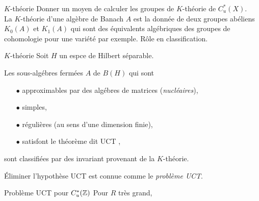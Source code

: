 \begin{frame}{$K$-th\'eorie}
Donner un moyen de calculer les groupes de $K$-th\'eorie de $C^*_u(X)$.\\
\vfill
La $K$-th\'eorie d'une alg\`ebre de Banach $A$ est la donn\'ee de deux groupes ab\'eliens $K_0(A)$ et $K_1(A)$ qui sont des \'equivalents alg\'ebriques des groupes de cohomologie pour une vari\'et\'e par exemple.  
\vfill
R\^{o}le en classification.\\
\vfill

\end{frame}

\begin{frame}{$K$-th\'eorie}
Soit $H$ un espce de Hilbert s\'eparable.
\vfill
\begin{theorem}
Les sous-alg\'ebres ferm\'ees $A$ de $B(H)$ qui sont
\begin{itemize}
\item[$\bullet$] approximables par des alg\'ebres de matrices (\textit{nucl\'eaires}),
\item[$\bullet$] simples,
\item[$\bullet$] r\'eguli\`eres (au sens d'une dimension finie),
\item[$\bullet$] satisfont le th\'eor\`eme dit UCT ,
\end{itemize}
sont classifi\'ees par des invariant provenant de la $K$-th\'eorie.
\end{theorem} 
\vfill
\'Eliminer l'hypoth\`ese UCT est connue comme le \textit{probl\`eme UCT}. 
\end{frame}

\begin{frame}{Probl\`eme UCT pour $C^*_u(\mathbb Z)$}
Pour $R$ tr\`es grand,
\begin{center}
\end{center}
\end{frame}


